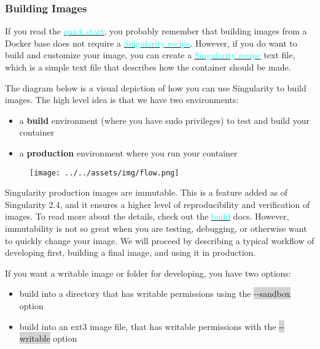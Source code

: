 \documentclass[a4paper]{article}
\newcounter{subsubsubsection}[subsubsection]
\begin{document}
\label{sec:singularityflow}
\subsubsection{Building Images}

If you read the \hyperref[sec:quickstart]{{\textcolor{cyan}{quick start}}}, you probably remember that building images from a Docker base does not require a \hyperref[sec:recipefile]{{\textcolor{cyan}{Singularity recipe}}}. However, if you do want to build and customize your image, you can create a \hyperref[sec:recipefile]{{\textcolor{cyan}{Singularity recipe}}} text file, which is a simple text file that describes how the container should be made.\\[0.1in]


	The diagram below is a visual depiction of how you can use Singularity to build images. The high level idea is that we have two environments:
	
	\begin{itemize}
	\item a \textbf{build} environment (where you have sudo privileges) to test and build your container
	\item a \textbf{production} environment where you run your container
\end{itemize}

\begin{figure}[h]
\centering
\hspace*{-0.62in}
{\texttt{[image: ../../assets/img/flow.png]}}
\end{figure}

Singularity production images are immutable. This is a feature added as of Singularity 2.4, and it ensures a higher level of reproducibility and verification of images. To read more about the details, check out the \hyperref[sec:buildcontainer]{{\textcolor{cyan}{build}}} docs. However, immutability is not so great when you are testing, debugging, or otherwise want to quickly change your image. We will proceed by describing a typical workflow of developing first, building a final image, and using it in production.

	If you want a writable image or folder for developing, you have two options:
\begin{itemize}
\item build into a directory that has writable permissions using the \colorbox{lightgray}{-{}-sandbox} option
\item build into an ext3 image file, that has writable permissions with the \colorbox{lightgray}{-{}-writable} option
\end{itemize}
\end{document}

